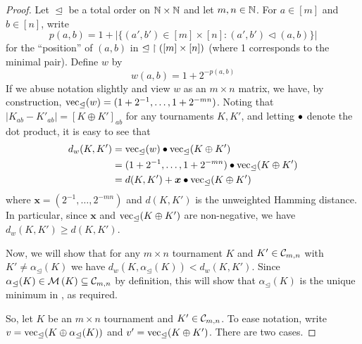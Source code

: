 \begin{proof}

    Let $\trianglelefteq$ be a total order on $\mathbb{N} \times \mathbb{N}$ and let $m, n \in
    \mathbb{N}$. For $a \in [m]$ and $b \in [n]$, write
    \[
        p(a,b)
        =
        1 + |\{(a',b') \in [m] \times [n] : (a',b') \vartriangleleft (a,b)\}|
    \]
    for the ``position'' of $(a,b)$ in ${\trianglelefteq} \upharpoonright ([m] \times [n])$
    (where 1 corresponds to the minimal pair). Define $w$ by
    \[
        w(a,b) = 1 + 2^{-p(a,b)}
    \]
    If we abuse notation slightly and view $w$ as an $m \times n$ matrix, we
    have, by construction, $\operatorname{vec}_{\trianglelefteq}(w) = (1 +
    2^{-1},\ldots,1 + 2^{-mn})$. Noting that $|K_{ab} - K'_{ab}| = [K \oplus
    K']_{ab}$ for any tournaments $K, K'$, and letting $\bullet$ denote the
    dot product, it is easy to see that
    \begin{align*}
        d_w(K, K')
        &= \operatorname{vec}_{\trianglelefteq}(w)
            \bullet \operatorname{vec}_{\trianglelefteq}(K \oplus K') \\
        &= (1 + 2^{-1},\ldots,1 + 2^{-mn})
           \bullet
           \operatorname{vec}_{\trianglelefteq}(K \oplus K') \\
        &= d(K, K') + \bm{x} \bullet \operatorname{vec}_{\trianglelefteq}(K \oplus K')
    \end{align*}
    where $\bm{x} = (2^{-1},\ldots,2^{-mn})$ and $d(K, K')$ is the
    unweighted Hamming distance. In particular, since $\bm{x}$ and
    $\operatorname{vec}_{\trianglelefteq}(K \oplus K')$ are non-negative, we have $d_w(K, K')
    \ge d(K, K')$.

    Now, we will show that for any $m \times n$ tournament $K$ and $K' \in
    \mathcal{C}_{m,n}$ with $K' \ne \alpha_{\trianglelefteq}(K)$ we have $d_w(K,
    \alpha_{\trianglelefteq}(K)) < d_w(K, K')$. Since
    $\alpha_{\trianglelefteq}(K) \in \operatorname{\mathcal{M}}\left({K}\right) \subseteq \mathcal{C}_{m,n}$ by
    definition, this will show that $\alpha_{\trianglelefteq}(K)$ is the
    unique minimum in , as required.

    So, let $K$ be an $m \times n$ tournament and $K' \in \mathcal{C}_{m,n}$. To ease
    notation, write $v = \operatorname{vec}_{\trianglelefteq}(K \oplus
    \alpha_{\trianglelefteq}(K))$ and $v' = \operatorname{vec}_{\trianglelefteq}(K \oplus K')$.
    There are two cases.


\end{proof}
